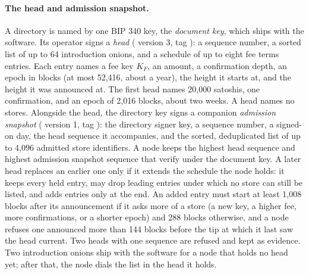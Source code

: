 \paragraph{The head and admission snapshot.} A directory is named by one BIP 340 key, the \emph{document key}, which ships with the software. Its operator signs a \emph{head} ( version 3, tag ): a sequence number, a sorted list of up to 64 introduction onions, and a schedule of up to eight fee terms entries. Each entry names a fee key $K_F$, an amount, a confirmation depth, an epoch in blocks (at most 52{,}416, about a year), the height it starts at, and the height it was announced at. The first head names 20{,}000 satoshis, one confirmation, and an epoch of 2{,}016 blocks, about two weeks. A head names no stores. Alongside the head, the directory key signs a companion \emph{admission snapshot} ( version 1, tag ): the directory signer key, a sequence number, a signed-on day, the head sequence it accompanies, and the sorted, deduplicated list of up to 4{,}096 admitted store identifiers. A node keeps the highest head sequence and highest admission snapshot sequence that verify under the document key. A later head replaces an earlier one only if it extends the schedule the node holds: it keeps every held entry, may drop leading entries under which no store can still be listed, and adds entries only at the end. An added entry must start at least 1{,}008 blocks after its announcement if it asks more of a store (a new key, a higher fee, more confirmations, or a shorter epoch) and 288 blocks otherwise, and a node refuses one announced more than 144 blocks before the tip at which it last saw the head current. Two heads with one sequence are refused and kept as evidence. Two introduction onions ship with the software for a node that holds no head yet; after that, the node dials the list in the head it holds.

